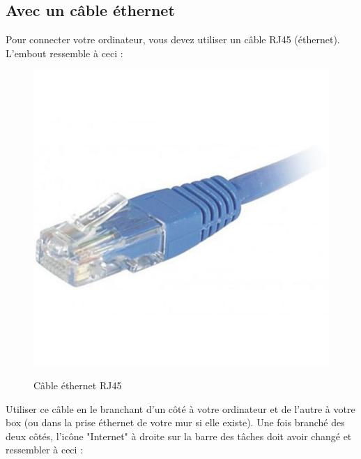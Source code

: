 \documentclass[12pt]{book}
\begin{document}
	\subsection{Avec un câble éthernet}
		Pour connecter votre ordinateur, vous devez utiliser un câble RJ45 (éthernet).
		L'embout ressemble à ceci :
		\begin{figure}[h]
			\centering
			\includegraphics[scale=0.045]{include/rj45.jpg}
			\label{fig:rj45}
			\caption{Câble éthernet RJ45}
		\end{figure}\par
		Utiliser ce câble en le branchant d'un côté à votre ordinateur et de l'autre à votre box (ou dans la prise éthernet de votre mur si elle existe).
		Une fois branché des deux côtés, l'icône "Internet" à droite sur la barre des tâches doit avoir changé et ressembler à ceci :
\end{document}
